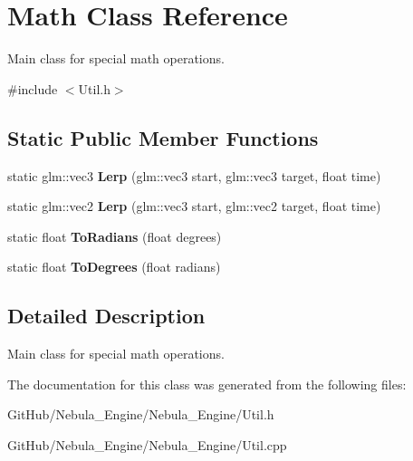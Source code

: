 \hypertarget{class_math}{}\section{Math Class Reference}
\label{class_math}


Main class for special math operations.  




{\ttfamily \#include $<$Util.\+h$>$}

\subsection*{Static Public Member Functions}
\begin{DoxyCompactItemize}
\item 
\mbox{\label{class_math_a16d1e7a7fb3b664f65c44dcb44db6682}} 
static glm\+::vec3 {\bfseries Lerp} (glm\+::vec3 start, glm\+::vec3 target, float time)
\item 
\mbox{\label{class_math_a6a135bea24c7700d1f11f733f60d6c03}} 
static glm\+::vec2 {\bfseries Lerp} (glm\+::vec3 start, glm\+::vec2 target, float time)
\item 
\mbox{\label{class_math_a3cb686c95bbcce3f8a96a9214263aaaa}} 
static float {\bfseries To\+Radians} (float degrees)
\item 
\mbox{\label{class_math_a0d041d1f5cd6c4ee20734f24f6abf1f0}} 
static float {\bfseries To\+Degrees} (float radians)
\end{DoxyCompactItemize}


\subsection{Detailed Description}
Main class for special math operations. 

The documentation for this class was generated from the following files\+:\begin{DoxyCompactItemize}
\item 
Git\+Hub/\+Nebula\+\_\+\+Engine/\+Nebula\+\_\+\+Engine/Util.\+h\item 
Git\+Hub/\+Nebula\+\_\+\+Engine/\+Nebula\+\_\+\+Engine/Util.\+cpp\end{DoxyCompactItemize}
